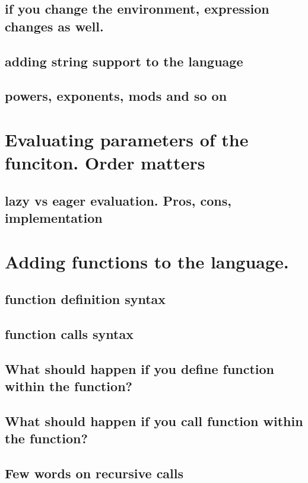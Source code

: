 \documentclass[11pt]{article}
\begin{document}
\subsection{if you change the environment, expression changes as well.}
\label{sec:org184657e}
\subsection{adding string support to the language}
\label{sec:org4d7f54b}

\subsection{powers, exponents, mods and so on}
\label{sec:org3d517b3}
\section{Evaluating parameters of the funciton. Order matters}
\label{sec:org8c348fc}
\subsection{lazy vs eager evaluation. Pros, cons, implementation}
\label{sec:org5d3b1e5}
\section{Adding functions to the language.}
\label{sec:org1df58d1}
\subsection{function definition syntax}
\label{sec:org44e4457}
\subsection{function calls syntax}
\label{sec:org7ff6b4f}
\subsection{What should happen if you define function within the function?}
\label{sec:org3b4555d}
\subsection{What should happen if you call function within the function?}
\label{sec:org8d01989}
\subsection{Few words on recursive calls}
\label{sec:org0fbc0ae}
\end{document}
